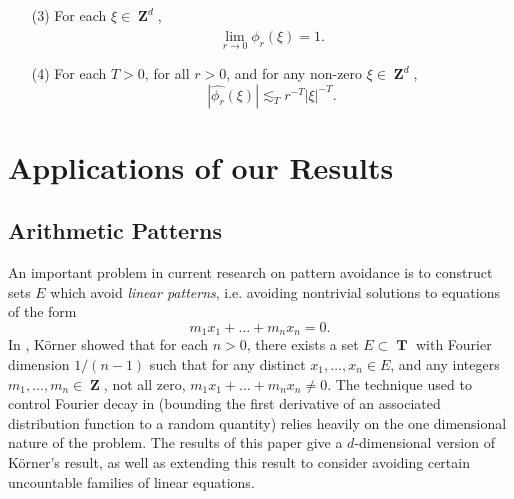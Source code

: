 \documentclass[dvipsnames,letterpaper,12pt]{article}
\numberwithin{equation}{section}
\DeclareMathOperator{\ZZ}{\mathbf{Z}}
\DeclareMathOperator{\TT}{\mathbf{T}}
\numberwithin{theorem}{section}
\begin{document}
\begin{itemize}
\begin{enumerate}

    \item[(3)] For each $\xi \in \ZZ^d$,
    \begin{equation} \label{approximationtoidentitypointwiseconvergence}
        \lim_{r \to 0} \widehat{\phi_r}(\xi) = 1.
    \end{equation}

    \item[(4)] For each $T > 0$, for all $r > 0$, and for any non-zero $\xi \in \ZZ^d$,
    \begin{equation} \label{molificationdecaybound}
        |\widehat{\phi_r}(\xi)| \lesssim_T r^{-T} |\xi|^{-T}.
    \end{equation}
\end{enumerate}
\end{itemize}




\section{Applications of our Results} \label{ApplicationsSection}

\subsection{Arithmetic Patterns}

An important problem in current research on pattern avoidance is to construct sets $E$ which avoid \emph{linear patterns}, i.e. avoiding nontrivial solutions to equations of the form
%
\[ m_1x_1 + \dots + m_nx_n = 0. \]
%
In \cite{Korner2}, K\"{o}rner showed that for each $n > 0$, there exists a set $E \subset \TT$ with Fourier dimension $1/(n-1)$ such that for any distinct $x_1,\dots,x_n \in E$, and any integers $m_1,\dots,m_n \in \ZZ$, not all zero, $m_1x_1 + \dots + m_nx_n \neq 0$. The technique used to control Fourier decay in \cite{Korner2} (bounding the first derivative of an associated distribution function to a random quantity) relies heavily on the one dimensional nature of the problem. The results of this paper give a $d$-dimensional version of K\"{o}rner's result, as well as extending this result to consider avoiding certain uncountable families of linear equations.
\end{document}
